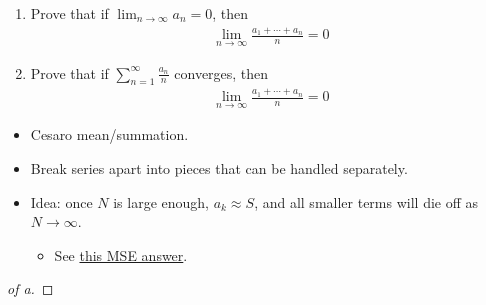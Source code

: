 \begin{enumerate}
\def\labelenumi{\alph{enumi}.}
\item
  Prove that if \(\displaystyle\lim_{n\to \infty } a_n = 0\), then
  \begin{align*}
  \lim _{n \rightarrow \infty} \frac{a_{1}+\cdots+a_{n}}{n}=0
  \end{align*}
\item
  Prove that if \(\displaystyle\sum_{n=1}^{\infty} \frac{a_{n}}{n}\)
  converges, then
  \begin{align*}
  \lim _{n \rightarrow \infty} \frac{a_{1}+\cdots+a_{n}}{n}=0
  \end{align*}
\end{enumerate}

\begin{solution}

\envlist

\begin{concept}

\envlist

\begin{itemize}
\tightlist
\item
  Cesaro mean/summation.
\item
  Break series apart into pieces that can be handled separately.
\item
  Idea: once \(N\) is large enough, \(a_k \approx S\), and all smaller
  terms will die off as \(N\to \infty\).

  \begin{itemize}
  \tightlist
  \item
    See
    \href{https://math.stackexchange.com/questions/514802/convergence-of-series-implies-convergence-of-cesaro-mean}{this
    MSE answer}.
  \end{itemize}
\end{itemize}

\end{concept}

\begin{proof}[of a]

\envlist


\end{proof}
\end{solution}
